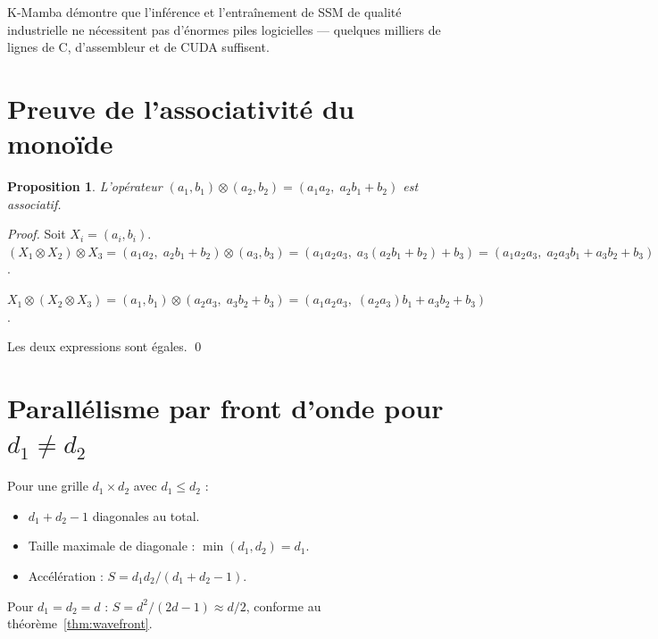 \documentclass[10pt,onecolumn]{article}
\newtheorem{proposition}{Proposition}
\begin{document}
K-Mamba démontre que l'inférence et l'entraînement de SSM de qualité industrielle
ne nécessitent pas d'énormes piles logicielles —
quelques milliers de lignes de C, d'assembleur et de CUDA suffisent.

\appendix
\section{Preuve de l'associativité du monoïde}
\label{app:monoid}

\begin{proposition}
L'opérateur $(a_1,b_1) \otimes (a_2,b_2) = (a_1 a_2,\; a_2 b_1 + b_2)$
est associatif.
\end{proposition}

\begin{proof}
Soit $X_i = (a_i, b_i)$.
$(X_1 \otimes X_2) \otimes X_3
= (a_1 a_2,\; a_2 b_1 + b_2) \otimes (a_3, b_3)
= (a_1 a_2 a_3,\; a_3(a_2 b_1 + b_2) + b_3)
= (a_1 a_2 a_3,\; a_2 a_3 b_1 + a_3 b_2 + b_3)$.

$X_1 \otimes (X_2 \otimes X_3)
= (a_1, b_1) \otimes (a_2 a_3,\; a_3 b_2 + b_3)
= (a_1 a_2 a_3,\; (a_2 a_3) b_1 + a_3 b_2 + b_3)$.

Les deux expressions sont égales. \qed
\end{proof}

\section{Parallélisme par front d'onde pour $d_1 \neq d_2$}
\label{app:wavefront_rect}

Pour une grille $d_1 \times d_2$ avec $d_1 \leq d_2$ :
\begin{itemize}
  \item $d_1 + d_2 - 1$ diagonales au total.
  \item Taille maximale de diagonale : $\min(d_1, d_2) = d_1$.
  \item Accélération : $S = d_1 d_2 / (d_1 + d_2 - 1)$.
\end{itemize}
Pour $d_1 = d_2 = d$ : $S = d^2/(2d-1) \approx d/2$, conforme au théorème~\ref{thm:wavefront}.



\end{document}
